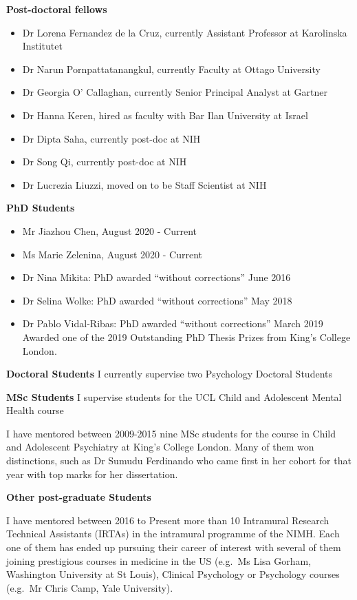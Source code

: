 \documentclass[
]{article}
\begin{document}
\textbf{Post-doctoral fellows}

\begin{itemize}
\item
  Dr Lorena Fernandez de la Cruz, currently Assistant Professor at
  Karolinska Institutet
\item
  Dr Narun Pornpattatanangkul, currently Faculty at Ottago University
\item
  Dr Georgia O' Callaghan, currently Senior Principal Analyst at Gartner
\item
  Dr Hanna Keren, hired as faculty with Bar Ilan University at Israel
\item
  Dr Dipta Saha, currently post-doc at NIH
\item
  Dr Song Qi, currently post-doc at NIH
\item
  Dr Lucrezia Liuzzi, moved on to be Staff Scientist at NIH
\end{itemize}

\textbf{PhD Students}

\begin{itemize}
\item
  Mr Jiazhou Chen, August 2020 - Current
\item
  Ms Marie Zelenina, August 2020 - Current
\item
  Dr Nina Mikita: PhD awarded ``without corrections'' June 2016
\item
  Dr Selina Wolke: PhD awarded ``without corrections'' May 2018
\item
  Dr Pablo Vidal-Ribas: PhD awarded ``without corrections'' March 2019
  Awarded one of the 2019 Outstanding PhD Thesis Prizes from King's
  College London.
\end{itemize}

\textbf{Doctoral Students} I currently supervise two Psychology Doctoral
Students

\textbf{MSc Students} I supervise students for the UCL Child and
Adolescent Mental Health course

I have mentored between 2009-2015 nine MSc students for the course in
Child and Adolescent Psychiatry at King's College London. Many of them
won distinctions, such as Dr Sumudu Ferdinando who came first in her
cohort for that year with top marks for her dissertation.

\textbf{Other post-graduate Students}

I have mentored between 2016 to Present more than 10 Intramural Research
Technical Assistants (IRTAs) in the intramural programme of the NIMH.
Each one of them has ended up pursuing their career of interest with
several of them joining prestigious courses in medicine in the US
(e.g.~Ms Lisa Gorham, Washington University at St Louis), Clinical
Psychology or Psychology courses (e.g.~Mr Chris Camp, Yale University).
\end{document}
